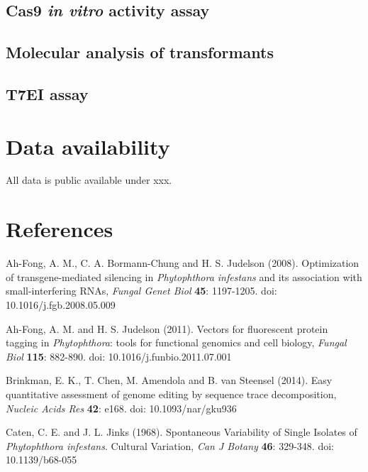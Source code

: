 \documentclass[onecolumn, 11pt,openany]{memoir}
\begin{document}
\begin{multicols}{2}
\begin{footnotesize}
\subsection{Cas9 \textit{in vitro} activity assay}
\lipsum[1]

\subsection{Molecular analysis of transformants}
\lipsum[1]

\subsection{T7EI assay}
\lipsum[1]

\section{Data availability}
All data is public available under xxx.

\end{footnotesize}


\section{References}
\setlength\parindent{-0.5 em}
\setlength{\parskip}{0 em}
\setlength{\leftskip}{0.5 em}

\begin{sloppy}
\begin{footnotesize}
Ah-Fong, A. M., C. A. Bormann-Chung and H. S. Judelson (2008). Optimization of transgene-mediated silencing in \textit{Phytophthora infestans} and its association with small-interfering RNAs, \textit{Fungal Genet Biol} \textbf{45}: 1197-1205. doi: 10.1016/j.fgb.2008.05.009

Ah-Fong, A. M. and H. S. Judelson (2011). Vectors for fluorescent protein tagging in \textit{Phytophthora}: tools for functional genomics and cell biology, \textit{Fungal Biol} \textbf{115}: 882-890. doi: 10.1016/j.funbio.2011.07.001

Brinkman, E. K., T. Chen, M. Amendola and B. van Steensel (2014). Easy quantitative assessment of genome editing by sequence trace decomposition, \textit{Nucleic Acids Res} \textbf{42}: e168. doi: 10.1093/nar/gku936

Caten, C. E. and J. L. Jinks (1968). Spontaneous Variability of Single Isolates of \textit{Phytophthora infestans}. Cultural Variation, \textit{Can J Botany} \textbf{46}: 329-348. doi: 10.1139/b68-055


\end{footnotesize}
\end{sloppy}
\end{multicols}
\end{document}
